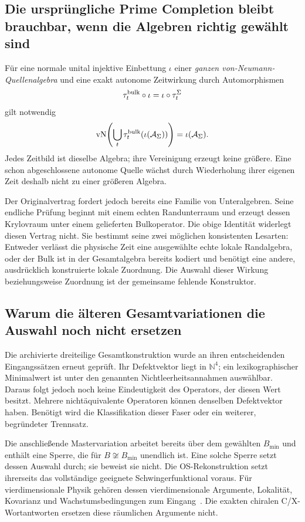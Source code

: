 \subsection{Die ursprüngliche Prime Completion bleibt brauchbar, wenn die Algebren richtig gewählt sind}
Für eine normale unital injektive Einbettung $\iota$ einer \emph{ganzen von-Neumann-Quellenalgebra} und eine exakt autonome Zeitwirkung durch Automorphismen
\begin{equation}
\tau_t^{\rm bulk}\circ\iota=\iota\circ\tau_t^\Sigma
\end{equation}
gilt notwendig
\begin{equation}
\operatorname{vN}\!\left(\bigcup_t
\tau_t^{\rm bulk}(\iota(\mathcal A_\Sigma))\right)
=\iota(\mathcal A_\Sigma).
\end{equation}
Jedes Zeitbild ist dieselbe Algebra; ihre Vereinigung erzeugt keine größere. Eine schon abgeschlossene autonome Quelle wächst durch Wiederholung ihrer eigenen Zeit deshalb nicht zu einer größeren Algebra.

Der Originalvertrag  fordert jedoch bereits eine Familie von Unteralgebren. Seine endliche Prüfung  beginnt mit einem echten Randunterraum und erzeugt dessen Krylovraum unter einem gelieferten Bulkoperator. Die obige Identität widerlegt diesen Vertrag nicht. Sie bestimmt seine zwei möglichen konsistenten Lesarten: Entweder verlässt die physische Zeit eine ausgewählte echte lokale Randalgebra, oder der Bulk ist in der Gesamtalgebra bereits kodiert und benötigt eine andere, ausdrücklich konstruierte lokale Zuordnung. Die Auswahl dieser Wirkung beziehungsweise Zuordnung ist der gemeinsame fehlende Konstruktor.

\subsection{Warum die älteren Gesamtvariationen die Auswahl noch nicht ersetzen}
Die archivierte dreiteilige Gesamtkonstruktion wurde an ihren entscheidenden Eingangssätzen erneut geprüft. Ihr Defektvektor liegt in $\mathbb N^4$; ein lexikographischer Minimalwert ist unter den genannten Nichtleerheitsannahmen auswählbar. Daraus folgt jedoch noch keine Eindeutigkeit des Operators, der diesen Wert besitzt. Mehrere nichtäquivalente Operatoren können denselben Defektvektor haben. Benötigt wird die Klassifikation dieser Faser oder ein weiterer, begründeter Trennsatz.

Die anschließende Mastervariation arbeitet bereits über dem gewählten $B_{\min}$ und enthält eine Sperre, die für $B\not\cong B_{\min}$ unendlich ist. Eine solche Sperre setzt dessen Auswahl durch; sie beweist sie nicht. Die OS-Rekonstruktion setzt ihrerseits das vollständige geeignete Schwingerfunktional voraus. Für vierdimensionale Physik gehören dessen vierdimensionale Argumente, Lokalität, Kovarianz und Wachstumsbedingungen zum Eingang~\cite{os1975}. Die exakten chiralen C/X-Wortantworten ersetzen diese räumlichen Argumente nicht.

